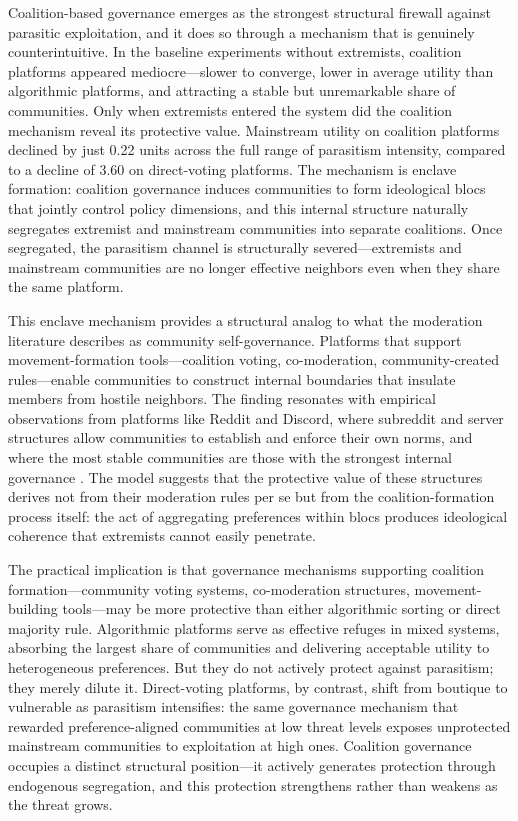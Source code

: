 Coalition-based governance emerges as the strongest structural firewall against parasitic exploitation, and it does so through a mechanism that is genuinely counterintuitive. In the baseline experiments without extremists, coalition platforms appeared mediocre---slower to converge, lower in average utility than algorithmic platforms, and attracting a stable but unremarkable share of communities. Only when extremists entered the system did the coalition mechanism reveal its protective value. Mainstream utility on coalition platforms declined by just 0.22 units across the full range of parasitism intensity, compared to a decline of 3.60 on direct-voting platforms. The mechanism is enclave formation: coalition governance induces communities to form ideological blocs that jointly control policy dimensions, and this internal structure naturally segregates extremist and mainstream communities into separate coalitions. Once segregated, the parasitism channel is structurally severed---extremists and mainstream communities are no longer effective neighbors even when they share the same platform.

This enclave mechanism provides a structural analog to what the moderation literature describes as community self-governance. Platforms that support movement-formation tools---coalition voting, co-moderation, community-created rules---enable communities to construct internal boundaries that insulate members from hostile neighbors. The finding resonates with empirical observations from platforms like Reddit and Discord, where subreddit and server structures allow communities to establish and enforce their own norms, and where the most stable communities are those with the strongest internal governance \citep{chandrasekharan2017you}. The model suggests that the protective value of these structures derives not from their moderation rules per se but from the coalition-formation process itself: the act of aggregating preferences within blocs produces ideological coherence that extremists cannot easily penetrate.

The practical implication is that governance mechanisms supporting coalition formation---community voting systems, co-moderation structures, movement-building tools---may be more protective than either algorithmic sorting or direct majority rule. Algorithmic platforms serve as effective refuges in mixed systems, absorbing the largest share of communities and delivering acceptable utility to heterogeneous preferences. But they do not actively protect against parasitism; they merely dilute it. Direct-voting platforms, by contrast, shift from boutique to vulnerable as parasitism intensifies: the same governance mechanism that rewarded preference-aligned communities at low threat levels exposes unprotected mainstream communities to exploitation at high ones. Coalition governance occupies a distinct structural position---it actively generates protection through endogenous segregation, and this protection strengthens rather than weakens as the threat grows.

